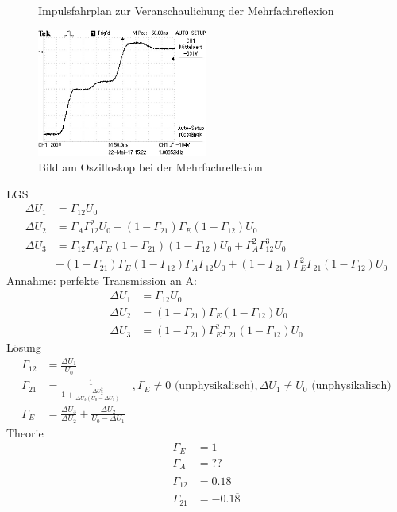 \begin{figure}[h]
	\centering
	
	\caption[Impulsfahrplan]{Impulsfahrplan zur Veranschaulichung der Mehrfachreflexion}
	\label{fig:Impulsfahrplan}
\end{figure}
\begin{figure}[h]
	\centering
	\includegraphics[width=0.5\textwidth]{Oszilloskop/Mehrfachreflexion/F0054TEK.JPG}
	\caption[Mehrfachreflexion]{Bild am Oszilloskop bei der Mehrfachreflexion}
	\label{fig:Mehrfachreflexion}
\end{figure}
LGS
\begin{align}
	\Delta U_1 &= \Gamma_{12}U_0 \\
	\Delta U_2 &= \Gamma_A\Gamma_{12}^2U_0 + (1-\Gamma_{21})\Gamma_E(1-\Gamma_{12})U_0 \\
	\Delta U_3 &= \Gamma_{12}\Gamma_A\Gamma_E(1-\Gamma_{21})(1-\Gamma_{12})U_0 + \Gamma_A^2\Gamma_{12}^3U_0 \\
	&+ (1-\Gamma_{21})\Gamma_E(1-\Gamma_{12})\Gamma_A\Gamma_{12}U_0 + (1-\Gamma_{21})\Gamma_E^2\Gamma_{21}(1-\Gamma_{12})U_0
\end{align}
Annahme: perfekte Transmission an A:
\begin{align}
	\Delta U_1 &= \Gamma_{12}U_0 \\
	\Delta U_2 &= (1-\Gamma_{21})\Gamma_E(1-\Gamma_{12})U_0 \\
	\Delta U_3 &= (1-\Gamma_{21})\Gamma_E^2\Gamma_{21}(1-\Gamma_{12})U_0
\end{align}
Lösung
\begin{align}
	\Gamma_{12} &= \frac{\Delta U_1}{U_0} \\
	\Gamma_{21} &= \frac{1}{1+\frac{\Delta U_2^2}{\Delta U_3(U_0-\Delta U_1)}} \quad, \Gamma_E \not= 0\text{ (unphysikalisch)}, \Delta U_1 \not= U_0\text{ (unphysikalisch)} \\
	\Gamma_E &= \frac{\Delta U_3}{\Delta U_2} + \frac{\Delta U_2}{U_0-\Delta U_1}
\end{align}
Theorie
\begin{align}
	\Gamma_E &= 1 \\
	\Gamma_A &= ?? \\
	\Gamma_{12} &= 0.1\overline{8} \\
	\Gamma_{21} &= -0.1\overline{8}
\end{align}